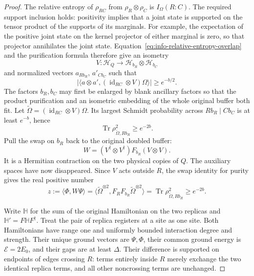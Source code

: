\documentclass[11pt]{article}
\numberwithin{equation}{section}
\theoremstyle{definition}
\theoremstyle{remark}
\begin{document}
\begin{proof}
The relative entropy of $\rho_{RC}$ from
$\rho_R\otimes\rho_C$ is $I_\Omega(R:C)$.  The required support
inclusion holds: positivity implies that a joint state is supported
on the tensor product of the supports of its marginals.  For example,
the expectation of the positive joint state on the kernel projector
of either marginal is zero, so that projector annihilates the joint
state.  Equation~\eqref{eq:info-relative-entropy-overlap} and the
purification formula therefore give an isometry
\[
 V:\mathcal H_Q\longrightarrow\mathcal H_{b_R}\otimes\mathcal H_{b_C}
\]
and normalized vectors $a_{Rb_R}$, $a'_{Cb_C}$ such that
\begin{equation}
 \bigl|\langle a\otimes a',(\operatorname{id}_{RC}\otimes V)\Omega\rangle\bigr|
       \ge e^{-b/2}.
 \label{eq:info-split-overlap}
\end{equation}
The factors $b_R,b_C$ may first be enlarged by blank ancillary factors
so that the product purification and an isometric embedding of the
whole original buffer both fit.  Let
$\widetilde\Omega=(\operatorname{id}_{RC}\otimes V)\Omega$.
Its largest Schmidt probability across $Rb_R\mid Cb_C$ is at least
$e^{-b}$, hence
\[
 \operatorname{Tr}\rho_{\widetilde\Omega,Rb_R}^{2}\ge e^{-2b}.
\]
Pull the swap on $b_R$ back to the original doubled buffer:
\[
 W=(V^\dagger\otimes V^\dagger)F_{b_R}(V\otimes V).
\]
It is a Hermitian contraction on the two physical copies of $Q$.
The auxiliary spaces have now disappeared.  Since $V$ acts outside
$R$, the swap identity for purity gives the real positive number
\begin{equation}
 z:=\langle\Phi,W\Psi\rangle
   =\langle\widetilde\Omega^{\otimes2},
          F_RF_{b_R}\widetilde\Omega^{\otimes2}\rangle
   =\operatorname{Tr}\rho_{\widetilde\Omega,Rb_R}^{2}
   \ge e^{-2b}.
 \label{eq:info-reset-overlap}
\end{equation}

Write $\mathbb H$ for the sum of the original Hamiltonian on the two
replicas and $\mathbb H'=F\mathbb H F^\dagger$.  Treat the pair of
replica registers at a site as one site.  Both Hamiltonians have range
one and uniformly bounded interaction degree and strength.  Their
unique ground vectors are $\Psi,\Phi$, their common ground energy is
$\mathcal E=2E_0$, and their gaps are at least $\Delta$.  Their
difference is supported on endpoints of edges crossing $R$: terms
entirely inside $R$ merely exchange the two identical replica terms,
and all other noncrossing terms are unchanged.


\end{proof}
\end{document}
